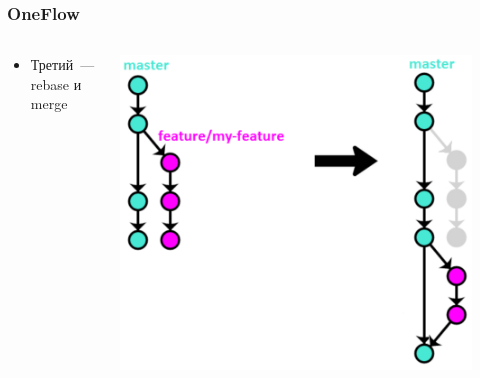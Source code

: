 \documentclass{../../slides-style}
\begin{document}
    \begin{frame}
        \frametitle{OneFlow}
        \begin{columns}
            \begin{column}{0.4\textwidth}
                \begin{itemize}
                    \item Третий~--- rebase и merge
                \end{itemize}
            \end{column}
            \begin{column}{0.6\textwidth}
                \begin{center}
                    \includegraphics[width=0.9\textwidth]{oneflow3.png}
                \end{center}
            \end{column}
        \end{columns}
    \end{frame}
\end{document}
